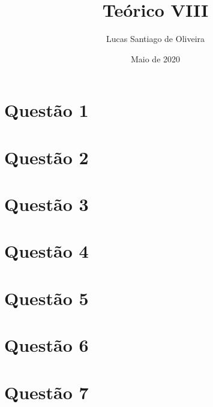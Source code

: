 \documentclass{article}
\title{Teórico VIII}
\author{Lucas Santiago de Oliveira}
\date{Maio de 2020}
\begin{document}
\maketitle

\section{Questão 1}

\vspace{1cm}

\section{Questão 2}

\vspace{1cm}

\section{Questão 3}

\vspace{1cm}

\section{Questão 4}

\vspace{1cm}

\section{Questão 5}

\vspace{1cm}

\section{Questão 6}

\vspace{1cm}

\section{Questão 7}

\vspace{1cm}
\end{document}
